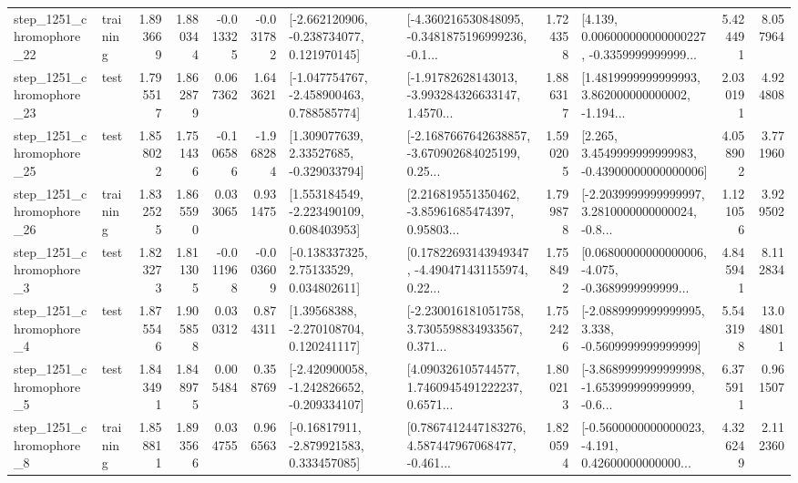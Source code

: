 \begin{tabular}{llrrrrllrlrr}
 step\_1251\_chromophore\_22 &  training &      1.893669 &    1.880344 &     -0.013325 & -0.031782 &   [-2.662120906, -0.238734077, 0.121970145] &  [-4.360216530848095, -0.3481875196999236, -0.1... &       1.724358 &  [4.139, 0.006000000000000227, -0.3359999999999... &            5.424491 &          8.057964 \\
 step\_1251\_chromophore\_23 &      test &      1.795517 &    1.862879 &      0.067362 &  1.643621 &   [-1.047754767, -2.458900463, 0.788585774] &  [-1.91782628143013, -3.993284326633147, 1.4570... &       1.886317 &  [1.4819999999999993, 3.862000000000002, -1.194... &            2.030191 &          4.924808 \\
 step\_1251\_chromophore\_25 &      test &      1.858022 &    1.751436 &     -0.106586 & -1.968284 &     [1.309077639, 2.33527685, -0.329033794] &  [-2.1687667642638857, -3.670902684025199, 0.25... &       1.590205 &  [2.265, 3.4549999999999983, -0.43900000000000006] &            4.058902 &          3.771960 \\
 step\_1251\_chromophore\_26 &  training &      1.832525 &    1.865590 &      0.033065 &  0.931475 &    [1.553184549, -2.223490109, 0.608403953] &  [2.216819551350462, -3.85961685474397, 0.95803... &       1.799878 &  [-2.2039999999999997, 3.2810000000000024, -0.8... &            1.121056 &          3.929502 \\
  step\_1251\_chromophore\_3 &      test &      1.823273 &    1.811305 &     -0.011968 & -0.003609 &     [-0.138337325, 2.75133529, 0.034802611] &  [0.17822693143949347, -4.490471431155974, 0.22... &       1.758492 &  [0.06800000000000006, -4.075, -0.3689999999999... &            4.845941 &          8.112834 \\
  step\_1251\_chromophore\_4 &      test &      1.875546 &    1.905858 &      0.030312 &  0.874311 &     [1.39568388, -2.270108704, 0.120241117] &  [-2.230016181051758, 3.7305598834933567, 0.371... &       1.752426 &  [-2.0889999999999995, 3.338, -0.5609999999999999] &            5.543198 &         13.048011 \\
  step\_1251\_chromophore\_5 &      test &      1.843491 &    1.848975 &      0.005484 &  0.358769 &  [-2.420900058, -1.242826652, -0.209334107] &  [4.090326105744577, 1.7460945491222237, 0.6571... &       1.800213 &  [-3.8689999999999998, -1.653999999999999, -0.6... &            6.375911 &          0.961507 \\
  step\_1251\_chromophore\_8 &  training &      1.858811 &    1.893566 &      0.034755 &  0.966563 &    [-0.16817911, -2.879921583, 0.333457085] &  [0.7867412447183276, 4.587447967068477, -0.461... &       1.820594 &  [-0.5600000000000023, -4.191, 0.42600000000000... &            4.326249 &          2.112360 \\

\end{tabular}
